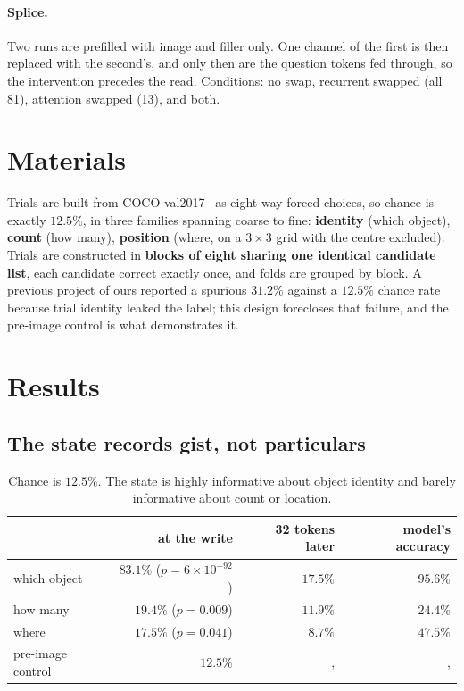 \documentclass[11pt]{article}
\begin{document}
\paragraph{Splice.} Two runs are prefilled with image and filler only. One
channel of the first is then replaced with the second's, and only then are the
question tokens fed through, so the intervention precedes the read. Conditions:
no swap, recurrent swapped (all 81), attention swapped (13), and both.

\section{Materials}

Trials are built from COCO val2017~\cite{lin2014coco} as eight-way forced
choices, so chance is exactly $12.5\%$, in three families spanning coarse to
fine: \textbf{identity} (which object), \textbf{count} (how many),
\textbf{position} (where, on a $3\times3$ grid with the centre excluded).
Trials are constructed in \textbf{blocks of eight sharing one identical
candidate list}, each candidate correct exactly once, and folds are grouped by
block. A previous project of ours reported a spurious $31.2\%$ against a
$12.5\%$ chance rate because trial identity leaked the label; this design
forecloses that failure, and the pre-image control is what demonstrates it.

\section{Results}

\subsection{The state records gist, not particulars}

\begin{table}[h]
\centering\small
\begin{tabular}{@{}lrrr@{}}
\toprule
& \textbf{at the write} & \textbf{32 tokens later} & \textbf{model's accuracy} \\
\midrule
which object & $83.1\%$ ($p=6\times10^{-92}$) & $17.5\%$ & $95.6\%$ \\
how many     & $19.4\%$ ($p=0.009$)           & $11.9\%$ & $24.4\%$ \\
where        & $17.5\%$ ($p=0.041$)           & $8.7\%$  & $47.5\%$ \\
\midrule
pre-image control & $12.5\%$ & ,  & ,  \\
\bottomrule
\end{tabular}
\caption{Chance is $12.5\%$. The state is highly informative about object
identity and barely informative about count or location.}
\end{table}
\end{document}
